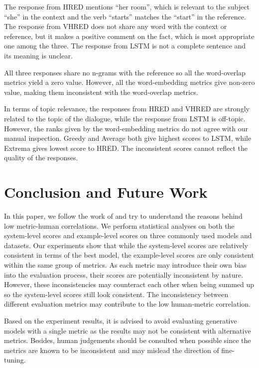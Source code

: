 \documentclass[conference]{IEEEtran}
\begin{document}
The response from HRED mentions ``her room'', which is relevant to the subject ``she'' in the context and the verb ``starts'' matches the ``start'' in the reference.
The response from VHRED does not share any word with the context or reference, but it makes a positive comment on the fact, which is most appropriate one among the three.
The response from LSTM is not a complete sentence and its meaning is unclear.

All three responses share no n-grams with the reference so all the word-overlap metrics yield a zero value.
However, all the word-embedding metrics give non-zero value, making them inconsistent with the word-overlap metrics.

In terms of topic relevance, the responses from HRED and VHRED are strongly related to the topic of the dialogue, while the response from LSTM is off-topic.
However, the ranks given by the word-embedding metrics do not agree with our manual inspection.
Greedy and Average both give highest scores to LSTM, while Extrema gives lowest score to HRED.
The inconsistent scores cannot reflect the quality of the responses.

\section{Conclusion and Future Work}
In this paper, we follow the work of \cite{HowNot} and try to understand the reasons behind low metric-human correlations.
We perform statistical analyses on both the system-level scores and example-level scores on three commonly used models and datasets.
Our experiments show that while the system-level scores are relatively consistent in terms of the best model,
the example-level scores are only consistent within the same group of metrics.
As each metric may introduce their own bias into the evaluation process, their scores are potentially inconsistent by nature.
However, these inconsistencies may counteract each other when being summed up so the system-level scores still look consistent.
The inconsistency between different evaluation metrics may contribute to the low human-metric correlation.

Based on the experiment results, it is advised to avoid evaluating generative models with a single metric as the results may not be
consistent with alternative metrics. Besides, human judgements should be consulted when possible since
the metrics are known to be inconsistent and may mislead the direction of fine-tuning.
\end{document}
